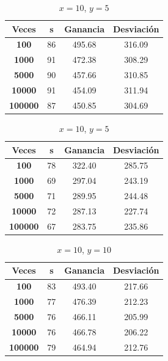\documentclass[11pt,a4paper]{report}
\begin{document}
\begin{table}[H]
	\parbox{.45\linewidth}{
	\centering
	\begin{tabular}{c|ccc}
	\textbf{Veces} & \textbf{s} & \textbf{Ganancia} & \textbf{Desviación} \\ \hline
	\textbf{100}   & 86         & 495.68            & 316.09			  \\ \hline
	\textbf{1000}  & 91         & 472.38            & 308.29			  \\ \hline
	\textbf{5000}  & 90         & 457.66            & 310.85 			  \\ \hline
	\textbf{10000} & 91         & 454.09            & 311.94			  \\ \hline
	\textbf{100000}& 87         & 450.85            & 304.69			  \\
	\end{tabular}
	\caption{$x=10$, $y=1$}
	}
	\hfill
	\parbox{.45\linewidth}{
	\centering
	\begin{tabular}{c|ccc}
	\textbf{Veces} & \textbf{s} & \textbf{Ganancia} & \textbf{Desviación} \\ \hline
	\textbf{100}   & 78         & 322.40            & 285.75			  \\ \hline
	\textbf{1000}  & 69         & 297.04            & 243.19			  \\ \hline
	\textbf{5000}  & 71         & 289.95            & 244.48 			  \\ \hline
	\textbf{10000} & 72         & 287.13            & 227.74			  \\ \hline
	\textbf{100000}& 67         & 283.75            & 235.86			  \\
	\end{tabular}
	\caption{$x=10$, $y=5$}
	}
\end{table}
\begin{table}[H]
	\centering
	\begin{tabular}{c|ccc}
	\textbf{Veces} & \textbf{s} & \textbf{Ganancia} & \textbf{Desviación} \\ \hline
	\textbf{100}   & 83         & 493.40            & 217.66			  \\ \hline
	\textbf{1000}  & 77         & 476.39            & 212.23			  \\ \hline
	\textbf{5000}  & 76         & 466.11            & 205.99 			  \\ \hline
	\textbf{10000} & 76         & 466.78            & 206.22			  \\ \hline
	\textbf{100000}& 79         & 464.94            & 212.76			  \\
	\end{tabular}
	\caption{$x=10$, $y=10$}
\end{table}
\end{document}
